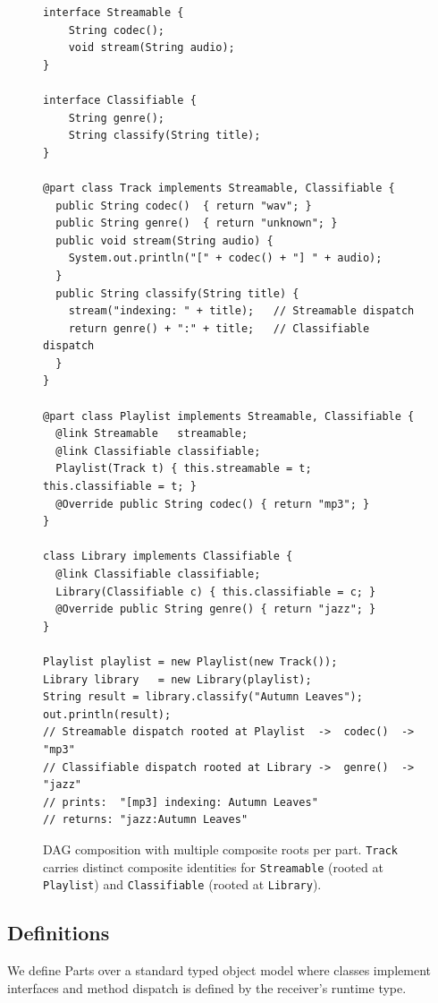 \documentclass[acmsmall,nonacm]{acmart}
\theoremstyle{acmplain}
\theoremstyle{acmdefinition}
\newcommand{\code}[1]{\texttt{#1}}
\begin{document}
\begin{figure}[H]
\begin{lstlisting}
interface Streamable {
    String codec();
    void stream(String audio);
}

interface Classifiable {
    String genre();
    String classify(String title);
}

@part class Track implements Streamable, Classifiable {
  public String codec()  { return "wav"; }
  public String genre()  { return "unknown"; }
  public void stream(String audio) {
    System.out.println("[" + codec() + "] " + audio);
  }
  public String classify(String title) {
    stream("indexing: " + title);   // Streamable dispatch
    return genre() + ":" + title;   // Classifiable dispatch
  }
}

@part class Playlist implements Streamable, Classifiable {
  @link Streamable   streamable;
  @link Classifiable classifiable;
  Playlist(Track t) { this.streamable = t; this.classifiable = t; }
  @Override public String codec() { return "mp3"; }
}

class Library implements Classifiable {
  @link Classifiable classifiable;
  Library(Classifiable c) { this.classifiable = c; }
  @Override public String genre() { return "jazz"; }
}

Playlist playlist = new Playlist(new Track());
Library library   = new Library(playlist);
String result = library.classify("Autumn Leaves");
out.println(result);
// Streamable dispatch rooted at Playlist  ->  codec()  -> "mp3"
// Classifiable dispatch rooted at Library ->  genre()  -> "jazz"
// prints:  "[mp3] indexing: Autumn Leaves"
// returns: "jazz:Autumn Leaves"
\end{lstlisting}
\caption{DAG composition with multiple composite roots per part.
\code{Track} carries distinct composite identities for \code{Streamable}
(rooted at \code{Playlist}) and \code{Classifiable} (rooted at \code{Library}).}
\label{fig:dag-listing}
\end{figure}

\subsection*{Definitions}

We define Parts over a standard typed object model where
classes implement interfaces and method dispatch is defined by the receiver's
runtime type.
\end{document}
